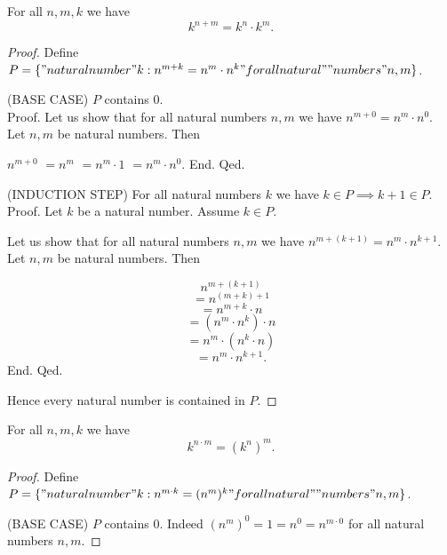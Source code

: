 \documentclass[../../natural-numbers.ftl.tex]{subfiles}
\begin{document}
\begin{forthel}
    \begin{proposition}[NN 01 04 461164]
      For all $n,m,k$ we have
      $$k^{n + m} = k^{n} \cdot k^{m}.$$
    \end{proposition}
    \begin{proof}
      Define $P = \{ "natural number" k : n^{m + k} = n^{m} \cdot n^{k} "for all natural"\\"numbers" n,m \}$.

      (BASE CASE) $P$ contains $0$. \\
      Proof.
        Let us show that for all natural numbers $n,m$ we have $n^{m + 0} = n^{m} \cdot n^{0}$.
          Let $n,m$ be natural numbers.
          Then

          $  n^{m + 0}$
          $= n^{m}$               %
          $= n^{m} \cdot 1$       %
          $= n^{m} \cdot n^{0}$.  %
        End.
      Qed.

      (INDUCTION STEP) For all natural numbers $k$ we have $k \in P \implies k + 1 \in P$. \\
      Proof.
        Let $k$ be a natural number.
        Assume $k \in P$.

        Let us show that for all natural numbers $n,m$ we have $n^{m + (k + 1)} =
        n^{m} \cdot n^{k + 1}$.
          Let $n,m$ be natural numbers.
          Then

          $$  n^{m + (k + 1)}$$
          $$= n^{(m + k) + 1}$$               %
          $$= n^{m + k} \cdot n$$             %
          $$= (n^{m} \cdot n^{k}) \cdot n$$   %
          $$= n^{m} \cdot (n^{k} \cdot n)$$   %
          $$= n^{m} \cdot n^{k + 1}.$$        %
        End.
      Qed.

      Hence every natural number is contained in $P$.
    \end{proof}


    \begin{proposition}[NN 01 04 531499]
      For all $n,m,k$ we have
      $$k^{n \cdot m} = (k^{n})^{m}.$$
    \end{proposition}
    \begin{proof}
      Define $P = \{ "natural number" k : n^{m \cdot k} = (n^{m})^{k} "for all natural"\\"numbers" n,m \}$.

      (BASE CASE) $P$ contains $0$.
      Indeed $(n^{m})^{0} = 1 = n^{0} = n^{m \cdot 0}$ for all natural numbers $n,m$.


\end{proof}
\end{forthel}
\end{document}
